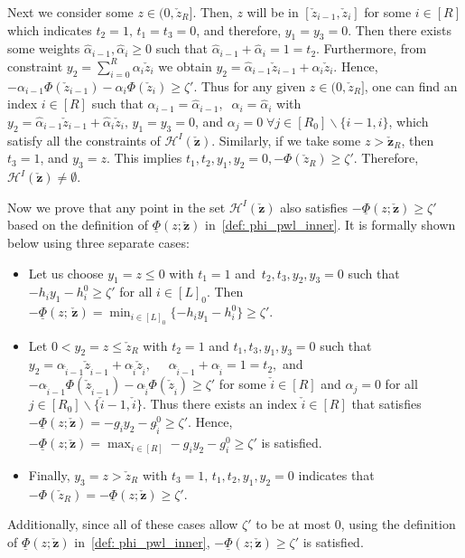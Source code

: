 \documentclass[opre,sglanonrev]{informs4}
\newcommand{\mH}{\mathcal{H}}
\newcommand{\zz}{\check{z}}
\newcommand{\bzz}{\bm{\zz}}
\begin{document}
{\begin{APPENDICES}
Next we consider some $z \in (0, \check{z}_{R}]$. Then, $z$ will be in $[\check{z}_{i-1}, \check{z}_{i}]$ for some $i \in [R]$ which indicates $t_2 = 1, \, t_1 = t_3 = 0$, and therefore, $y_1 = y_3 = 0$. Then there exists some weights $\hat{\alpha}_{i-1}, \hat{\alpha}_i \geq 0$ such that $\hat{\alpha}_{i-1} + \hat{\alpha}_i = 1 = t_2$. Furthermore, from constraint $y_2 = \sum_{i=0}^R \alpha_i \zz_{i}$ we obtain $y_2 = \hat{\alpha}_{i-1} \check{z}_{i-1} + \hat{\alpha}_i \check{z}_{i}$. 
Hence, $  -\alpha_{i-1} \Phi(\zz_{i-1}) - \alpha_{i} \Phi(\zz_{i}) \geq \zeta'$. Thus for any given $z \in (0, \check{z}_{R}]$, one can find an index $i \in [R]$ such that $\alpha_{i-1} = \hat{\alpha}_{i-1}, \;\; \alpha_i = \hat{\alpha}_i$ with $y_2 =  \hat{\alpha}_{i-1} \check{z}_{i-1} + \hat{\alpha}_i \check{z}_{i}, \, y_1 = y_3 = 0$, and  $\alpha_j = 0 \;\forall j \in [R_0] \backslash \{i-1, i\}$, which satisfy all the constraints of $\mH^I(\bzz)$. Similarly, if we take some $z > \bzz_{R}$, then $t_3 = 1$, and $y_3 = z$. This implies $t_1, t_2, y_1, y_2 = 0, -\Phi(\check{z}_{R}) \geq  \zeta'$. Therefore, $\mH^I(\bzz) \neq \emptyset$.

\vspace{1em}
Now we prove that any point in the set $\mH^I(\bzz)$ also satisfies $-\underline{\Phi} \left(z ; \bzz\right)  \geq \zeta'$ based on the definition of  $\underline{\Phi} \left(z ; \bzz\right)$ in~\eqref{def: phi_pwl_inner}. It is formally shown below using three separate cases:

\begin{itemize}
    \item[i)] Let us choose $ y_1 = z \leq 0$ with $t_1 = 1$ and $ \, t_2, t_3, y_2, y_3 = 0$ such that $ -h_i y_1 - h_i^0 \geq \zeta'$ for all $i \in [L]_0$. Then  $-\underline{\Phi} \left(z ; \, \bzz\right) = \min_{i \in [L]_0} \{ -h_i y_1 - h_i^0\} \geq \zeta'$.
    \item[ii)] Let $0 < y_2 = z \leq \zz_{R}$ with $ t_2=1$ and  $t_1, t_3, y_1, y_3 = 0$ such that $y_2 = \alpha_{\check{i}-1} \zz_{\check{i}-1} + \alpha_{\check{i}} \zz_{\check{i}}, \quad$  $\alpha_{\check{i} - 1} + \alpha_{\check{i}} = 1 = t_2, $ and $-\alpha_{\check{i} - 1}  \Phi(\zz_{\check{i} - 1}) - \alpha_{\check{i}} \Phi(\zz_{\check{i}})  \geq \zeta' $ for some $\check{i} \in [R]$ and $\alpha_{j} = 0$ for all $j \in [R_0] \backslash \{\check{i} - 1, \check{i} \}$. Thus there exists an index $\check{i} \in [R]$ that satisfies $-\underline{\Phi} \left(z ; \bzz\right) =  -g_{\check{i}} y_2 - g_{\check{i}}^0  \geq \zeta'$. Hence, $-\underline{\Phi} \left(z ; \bzz\right) =  \max_{i \in [R]} - g_{i} y_2 - g_{i}^0  \geq \zeta'$ is satisfied.
    \item[iii)] Finally, $ y_3 = z > \check{z}_{R}$ with $ t_3 = 1, \, t_1, t_2, y_1, y_2 = 0$ indicates that $-\Phi(\zz_{R}) = -\underline{\Phi} \left(z ; \bzz\right) \geq \zeta'$. 
\end{itemize}
Additionally, since all of these cases allow $\zeta'$ to be at most 0, using the definition of $\underline{\Phi}(z; \bzz)$ in~\eqref{def: phi_pwl_inner}, $-\underline{\Phi}(z; \bzz)  \geq \zeta'$ is satisfied. \hfill\qedsymbol



\end{APPENDICES}}
\end{document}
